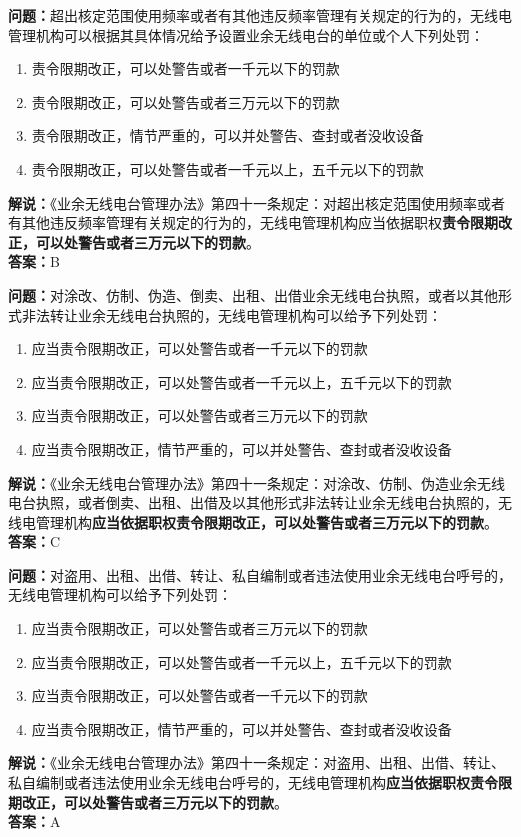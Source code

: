 \noindent\textbf{问题：}超出核定范围使用频率或者有其他违反频率管理有关规定的行为的，无线电管理机构可以根据其具体情况给予设置业余无线电台的单位或个人下列处罚：
\begin{enumerate}[label=\Alph*), leftmargin=3em]
  \item 责令限期改正，可以处警告或者一千元以下的罚款
  \item 责令限期改正，可以处警告或者三万元以下的罚款
  \item 责令限期改正，情节严重的，可以并处警告、查封或者没收设备
  \item 责令限期改正，可以处警告或者一千元以上，五千元以下的罚款
\end{enumerate}
\noindent\textbf{解说：}《业余无线电台管理办法》第四十一条规定：对超出核定范围使用频率或者有其他违反频率管理有关规定的行为的，无线电管理机构应当依据职权\textbf{责令限期改正，可以处警告或者三万元以下的罚款}。\\\textbf{答案：}B


\bigskip


\noindent\textbf{问题：}对涂改、仿制、伪造、倒卖、出租、出借业余无线电台执照，或者以其他形式非法转让业余无线电台执照的，无线电管理机构可以给予下列处罚：
\begin{enumerate}[label=\Alph*), leftmargin=3em] 
  \item 应当责令限期改正，可以处警告或者一千元以下的罚款
  \item 应当责令限期改正，可以处警告或者一千元以上，五千元以下的罚款
  \item 应当责令限期改正，可以处警告或者三万元以下的罚款
  \item 应当责令限期改正，情节严重的，可以并处警告、查封或者没收设备
\end{enumerate}
\noindent\textbf{解说：}《业余无线电台管理办法》第四十一条规定：对涂改、仿制、伪造业余无线电台执照，或者倒卖、出租、出借及以其他形式非法转让业余无线电台执照的，无线电管理机构\textbf{应当依据职权责令限期改正，可以处警告或者三万元以下的罚款}。\\\textbf{答案：}C

\bigskip


\noindent\textbf{问题：}对盗用、出租、出借、转让、私自编制或者违法使用业余无线电台呼号的，无线电管理机构可以给予下列处罚：
\begin{enumerate}[label=\Alph*), leftmargin=3em]
  \item 应当责令限期改正，可以处警告或者三万元以下的罚款
  \item 应当责令限期改正，可以处警告或者一千元以上，五千元以下的罚款
  \item 应当责令限期改正，可以处警告或者一千元以下的罚款
  \item 应当责令限期改正，情节严重的，可以并处警告、查封或者没收设备
\end{enumerate}
\noindent\textbf{解说：}《业余无线电台管理办法》第四十一条规定：对盗用、出租、出借、转让、私自编制或者违法使用业余无线电台呼号的，无线电管理机构\textbf{应当依据职权责令限期改正，可以处警告或者三万元以下的罚款}。\\\textbf{答案：}A

